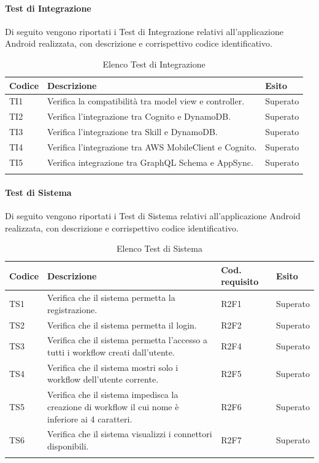 \paragraph{Test di Integrazione}
\label{sec:tiRA}
Di seguito vengono riportati i Test di Integrazione relativi all'applicazione Android realizzata, con descrizione e corrispettivo codice identificativo.
\begin{center}
	\centering
	\renewcommand{\arraystretch}{1.5}
	\begin{longtable}{  p{1.5cm}  p{10.5cm} p{2cm}  }
		\rowcolor{tableHeadYellow}
		\textbf{Codice}   & \textbf{Descrizione} & \textbf{Esito} \\ 
		\endhead
		TI1 & Verifica la compatibilità tra model view e controller.  & Superato \\
		TI2 & Verifica l’integrazione tra Cognito e DynamoDB. & Superato \\
		TI3 & Verifica l’integrazione tra Skill e DynamoDB. & Superato \\
		TI4 & Verifica l’integrazione tra AWS MobileClient e Cognito. & Superato \\
		TI5 & Verifica integrazione tra GraphQL Schema e AppSync. & Superato \\
		\rowcolor{white}
		\caption{Elenco Test di Integrazione}
	\end{longtable}
\end{center}
\paragraph{Test di Sistema}
\label{sec:tsRA}
Di seguito vengono riportati i Test di Sistema relativi all'applicazione Android realizzata, con descrizione e corrispettivo codice identificativo.
\begin{center}
	\centering
	\renewcommand{\arraystretch}{1.5}
	\begin{longtable}{  p{1.2cm}  p{8.5cm} p{2cm} p{1.5cm} }
		\rowcolor{tableHeadYellow}
		\textbf{Codice}   & \textbf{Descrizione} & \textbf{Cod. \mbox{requisito}} & \textbf{Esito} \\ 
		\endhead
		TS1 & Verifica che il sistema permetta la registrazione. & R2F1 & Superato \\
		TS2 & Verifica che il sistema permetta il login. & R2F2 & Superato \\
		TS3 & Verifica che il sistema permetta l’accesso a tutti i workflow creati dall’utente. & R2F4 & Superato \\
		TS4 & Verifica che il sistema mostri solo i workflow dell’utente corrente. & R2F5 & Superato \\
		TS5 & Verifica che il sistema impedisca la creazione di workflow il cui nome è inferiore ai 4 caratteri. & R2F6 & Superato \\
		TS6 & Verifica che il sistema visualizzi i connettori disponibili. & R2F7 & Superato \\
		\rowcolor{white}
		\caption{Elenco Test di Sistema}
	\end{longtable}
\end{center}
\pagebreak
